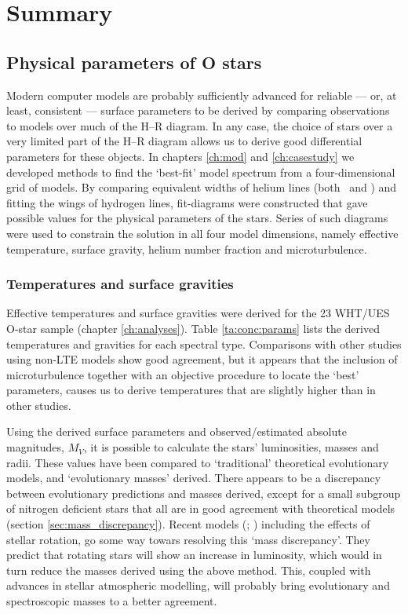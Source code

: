 \chapter{Summary}

\section{Physical parameters of O stars}

Modern computer models are probably sufficiently advanced for reliable
--- or, at least, consistent --- surface parameters to be derived by
comparing observations to models over much of the H--R diagram. In any
case, the choice of stars over a very limited part of the H--R diagram
allows us to derive good differential parameters for these objects. In
chapters \ref{ch:mod} and \ref{ch:casestudy} we developed methods to
find the `best-fit' model spectrum from a four-dimensional grid of
models. By comparing equivalent widths of helium lines (both \hei\ and
\heii) and fitting the wings of hydrogen lines, fit-diagrams were
constructed that gave possible values for the physical parameters of
the stars. Series of such diagrams were used to constrain the solution
in all four model dimensions, namely effective temperature, surface
gravity, helium number fraction and microturbulence.

\subsection{Temperatures and surface gravities}

Effective temperatures and surface gravities were derived for the 23
WHT/UES O-star sample (chapter \ref{ch:analyses}). Table
\ref{ta:conc:params} lists the derived temperatures and gravities for
each spectral type. Comparisons with other studies using non-LTE
models show good agreement, but it appears that the inclusion of
microturbulence together with an objective procedure to locate the
`best' parameters, causes us to derive temperatures that are slightly
higher than in other studies.

Using the derived surface parameters and observed/estimated absolute
magnitudes, $M_V$, it is possible to calculate the stars'
luminosities, masses and radii. These values have been compared to
`traditional' theoretical evolutionary models, and `evolutionary masses'
derived. There appears to be a discrepancy between evolutionary
predictions and masses derived, except for a small subgroup of
nitrogen deficient stars that all are in good agreement with
theoretical models (section \ref{sec:mass_discrepancy}). Recent models
(\cite{ma:98}; \cite{me:98}) including the effects of stellar
rotation, go some way towars resolving this `mass discrepancy'. They
predict that rotating stars will show an increase in luminosity,
which would in turn reduce the  masses derived using the above
method. This, coupled with advances in stellar atmospheric modelling,
will probably bring evolutionary and spectroscopic masses to a better
agreement.

